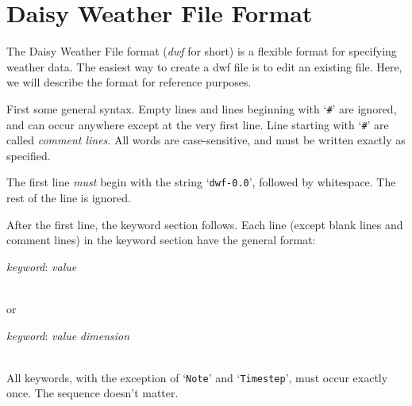 
\chapter{Daisy Weather File Format}
\label{cha:dwf}

The Daisy Weather File format (\emph{dwf} for short) is a flexible
format for specifying weather data.  The easiest way to create a dwf
file is to edit an existing file.  Here, we will describe the format
for reference purposes.

First some general syntax.  Empty lines and lines beginning with
`\texttt{\#}' are ignored, and can occur anywhere except at the very
first line.  Line starting with `\texttt{\#}' are called \emph{comment
  lines}.  All words are case-sensitive, and must be written exactly
as specified.

The first line \emph{must} begin with the string `\texttt{dwf-0.0}',
followed by whitespace.  The rest of the line is ignored.

After the first line, the keyword section follows.  Each line (except
blank lines and comment lines) in the keyword section have the general
format:\\
\begin{tt}
  \emph{keyword}: \emph{value}
\end{tt}\\
or\\ 
\begin{tt}
  \emph{keyword}: \emph{value} \emph{dimension}
\end{tt}\\
All keywords, with the exception of `\texttt{Note}' and
`\texttt{Timestep}', must occur exactly once.  The sequence doesn't
matter. 


